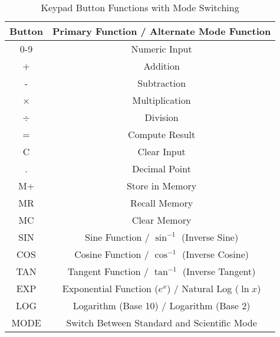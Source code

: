 \begin{table}[htps]
\centering
\begin{tabular}{|c|c|}
\hline
\textbf{Button} & \textbf{Primary Function} / \textbf{Alternate Mode Function} \\ 
\hline
0-9 & Numeric Input \\ 
\hline
+ & Addition \\ 
\hline
- & Subtraction \\ 
\hline
× & Multiplication \\ 
\hline
÷ & Division \\ 
\hline
= & Compute Result \\ 
\hline
C & Clear Input \\ 
\hline
. & Decimal Point \\ 
\hline
M+ & Store in Memory \\ 
\hline
MR & Recall Memory \\ 
\hline
MC & Clear Memory \\ 
\hline
SIN & Sine Function / $\sin^{-1}$ (Inverse Sine) \\ 
\hline
COS & Cosine Function / $\cos^{-1}$ (Inverse Cosine) \\ 
\hline
TAN & Tangent Function / $\tan^{-1}$ (Inverse Tangent) \\ 
\hline
EXP & Exponential Function ($e^x$) / Natural Log ($\ln x$) \\ 
\hline
LOG & Logarithm (Base 10) / Logarithm (Base 2) \\ 
\hline
MODE & Switch Between Standard and Scientific Mode \\ 
\hline
\end{tabular}
\caption{Keypad Button Functions with Mode Switching}
\label{tab:keypad}
\end{table}
